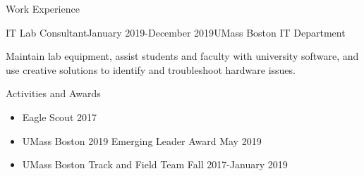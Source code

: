 \documentclass{resume} %
\begin{document}
\begin{Section}{Work Experience}
	\begin{Job}{IT Lab Consultant}{January 2019-December 2019}{UMass Boston IT Department}
		\item Maintain lab equipment, assist students and faculty with university software, and use creative solutions to identify and troubleshoot hardware issues.
	\end{Job}
	
	
\end{Section}

\begin{Section}{Activities and Awards} \itemsep -3pt
	\begin{itemize}[leftmargin=*]
		\itemsep -0.5em %
		\item Eagle Scout                                         \hfill {2017}
		\item UMass Boston 2019 Emerging Leader Award             \hfill {May 2019}
		\item UMass Boston Track and Field Team                   \hfill {Fall 2017-January 2019} 
	\end{itemize}
\end{Section}
\end{document}
